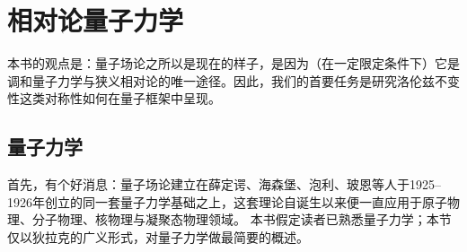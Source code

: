 \chapter{相对论量子力学}

本书的观点是：量子场论之所以是现在的样子，是因为（在一定限定条件下）它是调和量子力学与狭义相对论的唯一途径。因此，我们的首要任务是研究洛伦兹不变性这类对称性如何在量子框架中呈现。

\section{量子力学}
\label{sec:QM}

首先，有个好消息：量子场论建立在薛定谔、海森堡、泡利、玻恩等人于1925–1926年创立的同一套量子力学基础之上，这套理论自诞生以来便一直应用于原子物理、分子物理、核物理与凝聚态物理领域。
本书假定读者已熟悉量子力学；本节仅以狄拉克的广义形式，对量子力学做最简要的概述。


